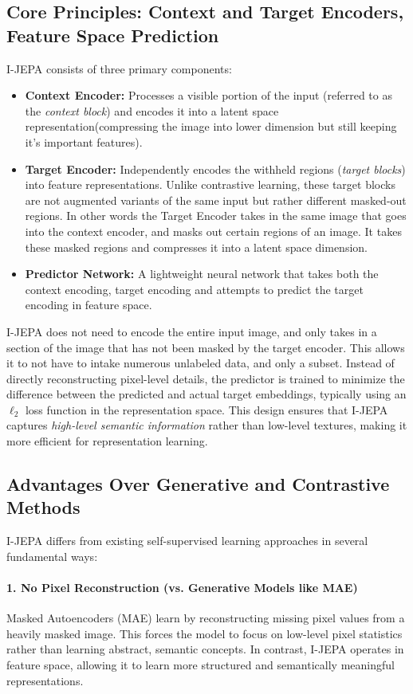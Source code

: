 \documentclass{article}
\begin{document}
\subsection{Core Principles: Context and Target Encoders, Feature Space Prediction}
I-JEPA consists of three primary components:
\begin{itemize}
    \item \textbf{Context Encoder:} Processes a visible portion of the input (referred to as the \textit{context block}) and encodes it into a latent space representation(compressing the image into lower dimension but still keeping it's important features).
    \item \textbf{Target Encoder:} Independently encodes the withheld regions (\textit{target blocks}) into feature representations. Unlike contrastive learning, these target blocks are not augmented variants of the same input but rather different masked-out regions. In other words the Target Encoder takes in the same image that goes into the context encoder, and masks out certain regions of an image. It takes these masked regions and compresses it into a latent space dimension. 
    \item \textbf{Predictor Network:} A lightweight neural network that takes both the context encoding, target encoding and attempts to predict the target encoding in feature space. 
\end{itemize}

I-JEPA does not need to encode the entire input image, and only takes in a section of the image that has not been masked by the target encoder. This allows it to not have to intake numerous unlabeled data, and only a subset. Instead of directly reconstructing pixel-level details, the predictor is trained to minimize the difference between the predicted and actual target embeddings, typically using an $\ell_2$ loss function in the representation space. This design ensures that I-JEPA captures \textit{high-level semantic information} rather than low-level textures, making it more efficient for representation learning.

\subsection{Advantages Over Generative and Contrastive Methods}
I-JEPA differs from existing self-supervised learning approaches in several fundamental ways:

\paragraph{1. No Pixel Reconstruction (vs. Generative Models like MAE)} Masked Autoencoders (MAE) \citep{he2021masked} learn by reconstructing missing pixel values from a heavily masked image. This forces the model to focus on low-level pixel statistics rather than learning abstract, semantic concepts. In contrast, I-JEPA operates in feature space, allowing it to learn more structured and semantically meaningful representations.
\end{document}
